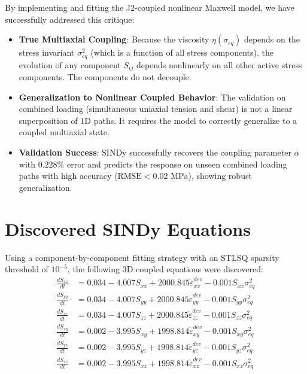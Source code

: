 \documentclass{article}
\begin{document}
By implementing and fitting the J2-coupled nonlinear Maxwell model, we have successfully addressed this critique:
\begin{itemize}
    \item \textbf{True Multiaxial Coupling}: Because the viscosity $\eta(\sigma_{eq})$ depends on the stress invariant $\sigma_{eq}^2$ (which is a function of all stress components), the evolution of any component $S_{ij}$ depends nonlinearly on all other active stress components. The components do not decouple.
    \item \textbf{Generalization to Nonlinear Coupled Behavior}: The validation on combined loading (simultaneous uniaxial tension and shear) is not a linear superposition of 1D paths. It requires the model to correctly generalize to a coupled multiaxial state. 
    \item \textbf{Validation Success}: SINDy successfully recovers the coupling parameter $\alpha$ with $0.228\%$ error and predicts the response on unseen combined loading paths with high accuracy ($\text{RMSE} < 0.02\text{ MPa}$), showing robust generalization.
\end{itemize}

\section{Discovered SINDy Equations}
Using a component-by-component fitting strategy with an STLSQ sparsity threshold of $10^{-5}$, the following 3D coupled equations were discovered:
\begin{align*}
    \frac{d S_{xx}}{dt} &= 0.034 - 4.007 S_{xx} + 2000.845 \dot{\varepsilon}^{dev}_{xx} - 0.001 S_{xx} \sigma_{eq}^2 \\
    \frac{d S_{yy}}{dt} &= 0.034 - 4.007 S_{yy} + 2000.845 \dot{\varepsilon}^{dev}_{yy} - 0.001 S_{yy} \sigma_{eq}^2 \\
    \frac{d S_{zz}}{dt} &= 0.034 - 4.007 S_{zz} + 2000.845 \dot{\varepsilon}^{dev}_{zz} - 0.001 S_{zz} \sigma_{eq}^2 \\
    \frac{d S_{xy}}{dt} &= 0.002 - 3.995 S_{xy} + 1998.814 \dot{\varepsilon}^{dev}_{xy} - 0.001 S_{xy} \sigma_{eq}^2 \\
    \frac{d S_{yz}}{dt} &= 0.002 - 3.995 S_{yz} + 1998.814 \dot{\varepsilon}^{dev}_{yz} - 0.001 S_{yz} \sigma_{eq}^2 \\
    \frac{d S_{xz}}{dt} &= 0.002 - 3.995 S_{xz} + 1998.814 \dot{\varepsilon}^{dev}_{xz} - 0.001 S_{xz} \sigma_{eq}^2 
\end{align*}
\end{document}
